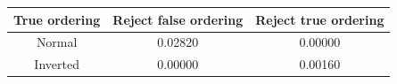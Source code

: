 \begin{tabular}{| c | c | c |}
\hline
True ordering & Reject false ordering & Reject true ordering \\
\hline
Normal & 0.02820 & 0.00000 \\
Inverted & 0.00000 & 0.00160 \\
\hline
\end{tabular}
